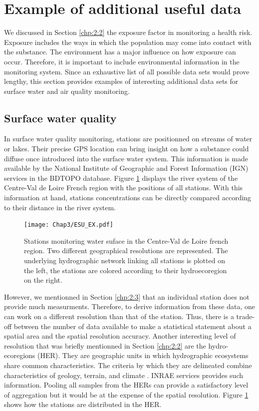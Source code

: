 \section{Example of additional useful data}\label{chp:2:4}

We discussed in Section \ref{chp:2:2} the exposure factor in monitoring a health risk. Exposure includes the ways in which the population may come into contact with the substance. The environment has a major influence on how exposure can occur. Therefore, it is important to include environmental information in the monitoring system. Since an exhaustive list of all possible data sets would prove lengthy, this section provides examples of interesting additional data sets for surface water and air quality monitoring.

\subsection{Surface water quality}

In surface water quality monitoring, stations are positionned on streams of water or lakes.  Their precise GPS location can bring insight on how a substance could diffuse once introduced into the surface water system. This information is made available by the National Institute of Geographic and Forest Information (IGN) services in the BDTOPO database. Figure \ref{fig:esu_ex} displays the river system of the Centre-Val de Loire French region with the positions of all stations. With this information at hand, stations concentrations can be directly compared according to their distance in the river system.     

\begin{figure}[ht]
    \centering
    \texttt{[image: Chap3/ESU\_EX.pdf]}
    \caption{Stations monitoring water suface in the Centre-Val de Loire french region. Two different geographical resolutions are represented. The underlying hydrographic network linking all stations is plotted on the left, the stations are colored according to their hydroecoregion on the right.}
    \label{fig:esu_ex}
\end{figure}

However, we mentionned in Section \ref{chp:2:3} that an individual station does not provide much measurments. Therefore, to derive information from these data, one can work on a different resolution than that of the station.  Thus, there is a trade-off between the number of data available to make a statistical statement about a spatial area and the spatial resolution accuracy. Another interesting level of resolution that was briefly mentionned in Section \ref{chp:2:2} are the hydro-ecoregions (HER). They are geographic units in which hydrographic ecosystems share common characteristics. The criteria by which they are delineated combine characteristics of geology, terrain, and climate \cite{wasson:hal-02580774}. INRAE services provides such information. Pooling all samples from the HERs can provide a satisfactory level of aggregation but it would be at the expense of the spatial resolution. Figure \ref{fig:esu_ex} shows how the stations are distributed in the HER.  

